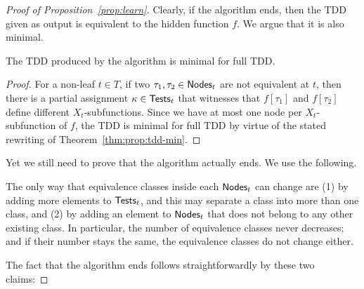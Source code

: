 \begin{toappendix}
\begin{proof}[Proof of Proposition~\ref{prop:learn}]
Clearly, if the algorithm ends, then the TDD given as output is equivalent to the hidden function $f$. We argue that it is also minimal.
\begin{claim}\label{claim:learn:min}
The TDD produced by the algorithm is minimal for full TDD.
\end{claim}
\begin{proof}
For a non-leaf $t\in T$, if two $\tau_1,\tau_2\in{\sf Nodes}_t$ are not equivalent at $t$, then there is a partial assignment $\kappa\in{\sf Tests}_t$ that witnesses that $f[\tau_1]$ and $f[\tau_2]$ define different $X_t$-subfunctions. Since we have at most one node per $X_t$-subfunction of $f$, the TDD is minimal for full TDD by virtue of the stated rewriting of Theorem~\ref{thm:prop:tdd-min}.
\end{proof}

Yet we still need to prove that the algorithm actually ends. We use the following.
\begin{remark}\label{rem:learn:equivs}
The only way that equivalence classes inside each ${\sf Nodes}_t$ can change are (1) by adding more elements to ${\sf Tests}_t$, and this may separate a class into more than one class, and (2) by adding an element to ${\sf Nodes}_t$ that does not belong to any other existing class. In particular, the number of equivalence classes never decreases; and if their number stays the same, the equivalence classes do not change either.
\end{remark}

The fact that the algorithm ends follows straightforwardly by these two claims:


\end{proof}
\end{toappendix}
